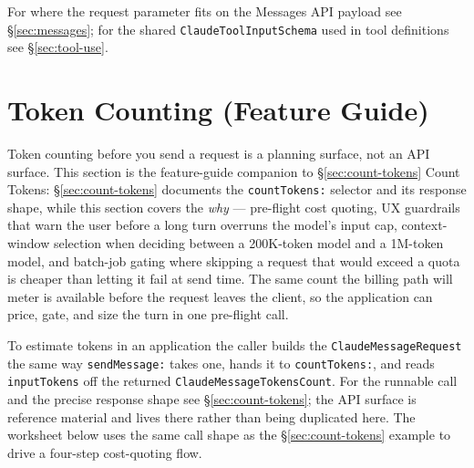 \documentclass[a4paper,10pt,fleqn]{article}
\begin{document}
\begin{sloppypar}
For where the request parameter fits on the Messages API payload
see §\ref{sec:messages}; for the shared
\texttt{ClaudeToolInputSchema} used in tool definitions see
§\ref{sec:tool-use}.
\end{sloppypar}

\medskip
\begin{sloppypar}
\end{sloppypar}

\section{Token Counting (Feature Guide)}
\label{sec:token-counting}

Token counting before you send a request is a planning surface,
not an API surface.  This section is the feature-guide companion
to §\ref{sec:count-tokens} Count Tokens: §\ref{sec:count-tokens}
documents the \texttt{countTokens:} selector and its response
shape, while this section covers the \emph{why} --- pre-flight cost
quoting, UX guardrails that warn the user before a long turn
overruns the model's input cap, context-window selection when
deciding between a 200K-token model and a 1M-token model, and
batch-job gating where skipping a request that would exceed a
quota is cheaper than letting it fail at send time.  The same
count the billing path will meter is available before the request
leaves the client, so the application can price, gate, and size
the turn in one pre-flight call.

\begin{sloppypar}
To estimate tokens in an application the caller builds the
\texttt{ClaudeMessageRequest} the same way \texttt{sendMessage:}
takes one, hands it to \texttt{countTokens:}, and reads
\texttt{inputTokens} off the returned
\texttt{ClaudeMessageTokensCount}.  For the runnable call and the
precise response shape see §\ref{sec:count-tokens}; the API surface
is reference material and lives there rather than being duplicated
here.  The worksheet below uses the same call shape as the
§\ref{sec:count-tokens} example to drive a four-step cost-quoting
flow.
\end{sloppypar}
\end{document}

